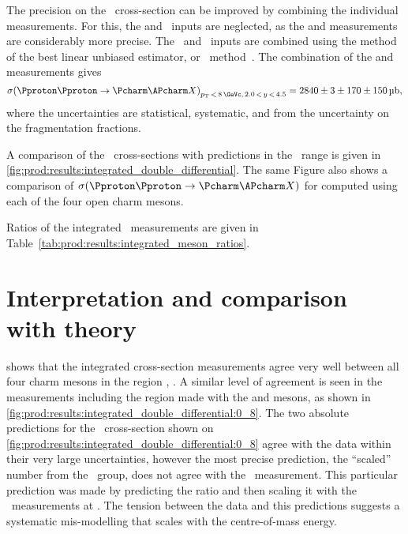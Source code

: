 The precision on the \ccbar\ cross-section can be improved by combining the
individual measurements.
For this, the \PDsplus and \PDstarp\ inputs are neglected, as the \PDzero and
\PDplus measurements are considerably more precise.
The \PDzero\ and \PDplus\ inputs are combined using the method of the best
linear unbiased estimator, or \blue\ method~\cite{Lyons:1988rp}.
The combination of the \PDzero and \PDplus measurements gives
\begin{equation*}
  \xsec{(\ppToccbarX)}_{\pT\,<\,8\,\si{\GeVc},\,2.0\,<\,y\,<\,4.5} =
    \SI[parse-numbers=false]{2840 \pm 3 \pm 170 \pm 150}{\micro\barn},
\end{equation*}
where the uncertainties are statistical, systematic, and from the uncertainty
on the fragmentation fractions.

A comparison of the \ccbar\ cross-sections with predictions in the \pT\ range
 is given in
\cref{fig:prod:results:integrated_double_differential}.
The same Figure also shows a comparison of $\xsec(\ppToccbarX)$ for
 computed using each of the four open charm mesons.

Ratios of the integrated \xsectimesbfrac\ measurements are given in
Table~\ref{tab:prod:results:integrated_meson_ratios}.

\section{Interpretation and comparison with theory}
\label{chap:prod:results:discussion}

 shows that the
integrated cross-section measurements agree very well between all four charm
mesons in the region , .
A similar level of agreement is seen in the measurements including the
 region made with the \PDzero and \PDplus mesons, as shown in
\cref{fig:prod:results:integrated_double_differential:0_8}.
The two absolute predictions for the \ccbar\ cross-section shown on
\cref{fig:prod:results:integrated_double_differential:0_8} agree with the data
within their very large uncertainties, however the most precise prediction, the
``scaled'' number from the \nnpdfl\ group, does not agree with the \lhcb\
measurement.
This particular prediction was made by predicting the ratio 
and then scaling it with the \lhcb\ measurements at \sqrtseq{7}.
The tension between the data and this predictions suggests a systematic
mis-modelling that scales with the centre-of-mass energy.

